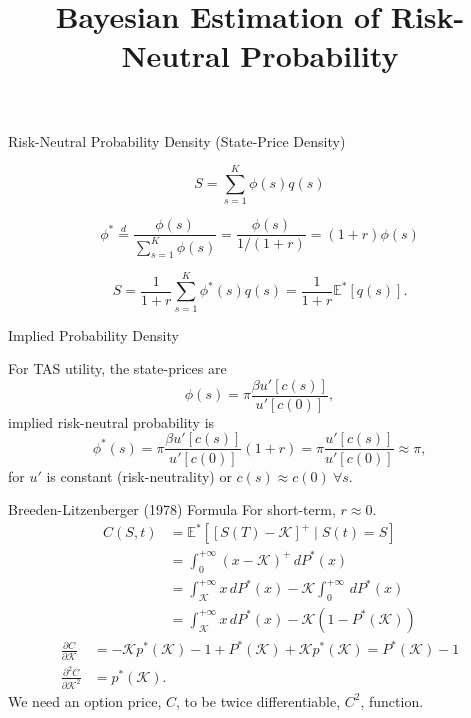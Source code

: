 \documentclass[10pt,aspectratio=43]{beamer}
\title{Bayesian Estimation of Risk-Neutral Probability}
\begin{document}
\begin{frame}[fragile]
    \titlepage
\end{frame}




\begin{frame}{ Risk-Neutral Probability Density (State-Price Density)}

    \[S=\sum_{s=1}^K\phi(s)q(s)\]

    \[\phi^*\overset{d}{=}\frac{\phi(s)}{\sum_{s=1}^K\phi(s)}=\frac{\phi(s)}{1/(1+r)}=(1+r)\phi(s)\]

    \[S=\frac{1}{1+r}\sum_{s=1}^K\phi^*(s)q(s)=\frac{1}{1+r}\mathbb{E}^*[q(s)].\]

\end{frame}
\begin{frame}{Implied  Probability Density}
 
    For TAS utility, the state-prices are 
    \[\phi(s)=\pi\frac{\beta u'[c(s)]}{u'[c(0)]},\]
    \then implied risk-neutral probability is
    \[\phi^*(s)=\pi\frac{\beta u'[c(s)]}{u'[c(0)]}(1+r)= \pi\frac{u'[c(s)]}{u'[c(0)]}\approx \pi,\]
    for $u'$ is constant (risk-neutrality) or $c(s)\approx c(0)~\forall s$.


\end{frame}

\begin{frame}{Breeden-Litzenberger (1978) Formula}
\nocite{breedenPricesStateContingentClaims1978}
For short-term, $r\approx 0$.
    \begin{align*}
        C(S,t)&=\mathbb{E}^*\left[[S(T)-\mathcal{K}]^+\mid S(t)=S\right]\\ 
        &=\int_0^{+\infty}(x-\mathcal{K})^+\,dP^*(x)\\ &=\int_{\mathcal{K}}^{+\infty}x\,dP^*(x)-\mathcal{K}\int_0^{+\infty}\,dP^*(x)\\ 
        &=\int_{\mathcal{K}}^{+\infty}x\,dP^*(x)-\mathcal{K}(1-P^*(\mathcal{K}))
    \end{align*}
    \begin{align*}
        \frac{\partial C}{\partial \mathcal{K}}&=-\mathcal{K}p^*(\mathcal{K})-1+P^*(\mathcal{K})+\mathcal{K}p^*(\mathcal{K})=P^*(\mathcal{K})-1\\ 
        \frac{\partial^2 C}{\partial \mathcal{K}^2}&=p^*(\mathcal{K}).
    \end{align*}
   We need an option price, $C$, to be twice differentiable, $C^2$, function.
\end{frame}
\end{document}
